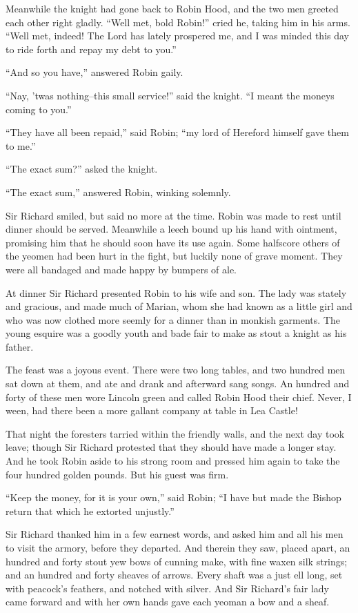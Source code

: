 Meanwhile the knight had gone back to Robin Hood, and the two men
greeted each other right gladly. ``Well met, bold Robin!'' cried he,
taking him in his arms. ``Well met, indeed! The Lord has lately
prospered me, and I was minded this day to ride forth and repay my debt
to you.''

``And so you have,'' answered Robin gaily.

``Nay, 'twas nothing--this small service!'' said the knight. ``I meant
the moneys coming to you.''

``They have all been repaid,'' said Robin; ``my lord of Hereford himself
gave them to me.''

``The exact sum?'' asked the knight.

``The exact sum,'' answered Robin, winking solemnly.

Sir Richard smiled, but said no more at the time. Robin was made to rest
until dinner should be served. Meanwhile a leech bound up his hand with
ointment, promising him that he should soon have its use again. Some
halfscore others of the yeomen had been hurt in the fight, but luckily
none of grave moment. They were all bandaged and made happy by bumpers
of ale.

At dinner Sir Richard presented Robin to his wife and son. The lady was
stately and gracious, and made much of Marian, whom she had known as a
little girl and who was now clothed more seemly for a dinner than in
monkish garments. The young esquire was a goodly youth and bade fair to
make as stout a knight as his father.

The feast was a joyous event. There were two long tables, and two
hundred men sat down at them, and ate and drank and afterward sang
songs. An hundred and forty of these men wore Lincoln green and called
Robin Hood their chief. Never, I ween, had there been a more gallant
company at table in Lea Castle!

That night the foresters tarried within the friendly walls, and the next
day took leave; though Sir Richard protested that they should have made
a longer stay. And he took Robin aside to his strong room and pressed
him again to take the four hundred golden pounds. But his guest was
firm.

``Keep the money, for it is your own,'' said Robin; ``I have but made
the Bishop return that which he extorted unjustly.''

Sir Richard thanked him in a few earnest words, and asked him and all
his men to visit the armory, before they departed. And therein they saw,
placed apart, an hundred and forty stout yew bows of cunning make, with
fine waxen silk strings; and an hundred and forty sheaves of arrows.
Every shaft was a just ell long, set with peacock's feathers, and
notched with silver. And Sir Richard's fair lady came forward and with
her own hands gave each yeoman a bow and a sheaf.

